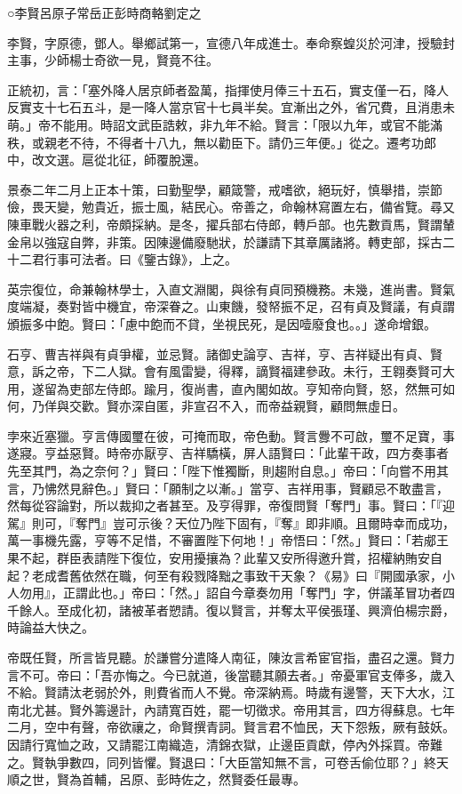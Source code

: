 
\begin{pinyinscope}
○李賢呂原子常岳正彭時商輅劉定之

李賢，字原德，鄧人。舉鄉試第一，宣德八年成進士。奉命察蝗災於河津，授驗封主事，少師楊士奇欲一見，賢竟不往。

正統初，言：「塞外降人居京師者盈萬，指揮使月俸三十五石，實支僅一石，降人反實支十七石五斗，是一降人當京官十七員半矣。宜漸出之外，省冗費，且消患未萌。」帝不能用。時詔文武臣誥敕，非九年不給。賢言：「限以九年，或官不能滿秩，或親老不待，不得者十八九，無以勸臣下。請仍三年便。」從之。遷考功郎中，改文選。扈從北征，師覆脫還。

景泰二年二月上正本十策，曰勤聖學，顧箴警，戒嗜欲，絕玩好，慎舉措，崇節儉，畏天變，勉貴近，振士風，結民心。帝善之，命翰林寫置左右，備省覽。尋又陳車戰火器之利，帝頗採納。是冬，擢兵部右侍郎，轉戶部。也先數貢馬，賢謂輦金帛以強寇自弊，非策。因陳邊備廢馳狀，於謙請下其章厲諸將。轉吏部，採古二十二君行事可法者。曰《鑒古錄》，上之。

英宗復位，命兼翰林學士，入直文淵閣，與徐有貞同預機務。未幾，進尚書。賢氣度端凝，奏對皆中機宜，帝深眷之。山東饑，發帑振不足，召有貞及賢議，有貞謂頒振多中飽。賢曰：「慮中飽而不貸，坐視民死，是因噎廢食也。。」遂命增銀。

石亨、曹吉祥與有貞爭權，並忌賢。諸御史論亨、吉祥，亨、吉祥疑出有貞、賢意，訴之帝，下二人獄。會有風雷變，得釋，謫賢福建參政。未行，王翱奏賢可大用，遂留為吏部左侍郎。踰月，復尚書，直內閣如故。亨知帝向賢，怒，然無可如何，乃佯與交歡。賢亦深自匿，非宣召不入，而帝益親賢，顧問無虛日。

孛來近塞獵。亨言傳國璽在彼，可掩而取，帝色動。賢言釁不可啟，璽不足寶，事遂寢。亨益惡賢。時帝亦厭亨、吉祥驕橫，屏人語賢曰：「此輩干政，四方奏事者先至其門，為之奈何？」賢曰：「陛下惟獨斷，則趨附自息。」帝曰：「向嘗不用其言，乃怫然見辭色。」賢曰：「願制之以漸。」當亨、吉祥用事，賢顧忌不敢盡言，然每從容論對，所以裁抑之者甚至。及亨得罪，帝復問賢「奪門」事。賢曰：「『迎駕』則可，『奪門』豈可示後？天位乃陛下固有，『奪』即非順。且爾時幸而成功，萬一事機先露，亨等不足惜，不審置陛下何地！」帝悟曰：「然。」賢曰：「若郕王果不起，群臣表請陛下復位，安用擾攘為？此輩又安所得邀升賞，招權納賄安自起？老成耆舊依然在職，何至有殺戮降黜之事致干天象？《易》曰『開國承家，小人勿用』，正謂此也。」帝曰：「然。」詔自今章奏勿用「奪門」字，併議革冒功者四千餘人。至成化初，諸被革者愬請。復以賢言，并奪太平侯張瑾、興濟伯楊宗爵，時論益大快之。

帝既任賢，所言皆見聽。於謙嘗分遣降人南征，陳汝言希宦官指，盡召之還。賢力言不可。帝曰：「吾亦悔之。今已就道，後當聽其願去者。」帝憂軍官支俸多，歲入不給。賢請汰老弱於外，則費省而人不覺。帝深納焉。時歲有邊警，天下大水，江南北尤甚。賢外籌邊計，內請寬百姓，罷一切徵求。帝用其言，四方得蘇息。七年二月，空中有聲，帝欲禳之，命賢撰青詞。賢言君不恤民，天下怨叛，厥有鼓妖。因請行寬恤之政，又請罷江南織造，清錦衣獄，止邊臣貢獻，停內外採買。帝難之。賢執爭數四，同列皆懼。賢退曰：「大臣當知無不言，可卷舌偷位耶？」終天順之世，賢為首輔，呂原、彭時佐之，然賢委任最專。


\end{pinyinscope}
